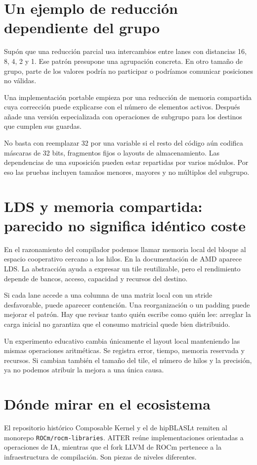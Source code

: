 \documentclass[12pt,a4paper,oneside]{report}
\begin{document}
\section{Un ejemplo de reducción dependiente del grupo}
Supón que una reducción parcial usa intercambios entre lanes con distancias 16, 8, 4, 2 y 1. Ese patrón presupone una agrupación concreta. En otro tamaño de grupo, parte de los valores podría no participar o podríamos comunicar posiciones no válidas.

Una implementación portable empieza por una reducción de memoria compartida cuya corrección puede explicarse con el número de elementos activos. Después añade una versión especializada con operaciones de subgrupo para los destinos que cumplen sus guardas.

No basta con reemplazar 32 por una variable si el resto del código aún codifica máscaras de 32 bits, fragmentos fijos o layouts de almacenamiento. Las dependencias de una suposición pueden estar repartidas por varios módulos. Por eso las pruebas incluyen tamaños menores, mayores y no múltiplos del subgrupo.

\section{LDS y memoria compartida: parecido no significa idéntico coste}
En el razonamiento del compilador podemos llamar memoria local del bloque al espacio cooperativo cercano a los hilos. En la documentación de AMD aparece LDS. La abstracción ayuda a expresar un tile reutilizable, pero el rendimiento depende de bancos, acceso, capacidad y recursos del destino.

Si cada lane accede a una columna de una matriz local con un stride desfavorable, puede aparecer contención. Una reorganización o un padding puede mejorar el patrón. Hay que revisar tanto quién escribe como quién lee: arreglar la carga inicial no garantiza que el consumo matricial quede bien distribuido.

Un experimento educativo cambia únicamente el layout local manteniendo las mismas operaciones aritméticas. Se registra error, tiempo, memoria reservada y recursos. Si cambian también el tamaño del tile, el número de hilos y la precisión, ya no podemos atribuir la mejora a una única causa.

\section{Dónde mirar en el ecosistema}
El repositorio histórico Composable Kernel y el de hipBLASLt remiten al monorepo \texttt{ROCm/rocm-libraries}. AITER reúne implementaciones orientadas a operaciones de IA, mientras que el fork LLVM de ROCm pertenece a la infraestructura de compilación. Son piezas de niveles diferentes. \cite{ck,hipblaslt,rocm-libraries,aiter,rocm-llvm}
\end{document}
